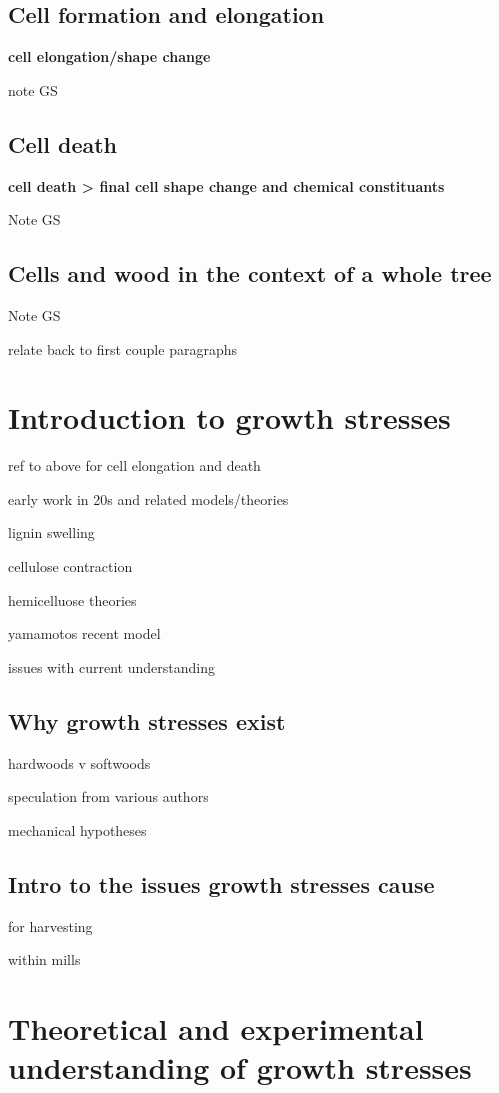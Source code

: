 \documentclass{article}
\begin{document}
\subsection{Cell formation and elongation}

\textbf{cell elongation/shape change}

note GS
\subsection{Cell death}
\textbf{cell death > final cell shape change and chemical constituants}

Note GS
\subsection{Cells and wood in the context of a whole tree}

Note GS

relate back to first couple paragraphs


\section{Introduction to growth stresses}

ref to above for cell elongation and death

early work in 20s and related models/theories

lignin swelling

cellulose contraction

hemicelluose theories

yamamotos recent model

issues with current understanding


\subsection{Why growth stresses exist}

hardwoods v softwoods

speculation from various authors

mechanical hypotheses

\subsection{Intro to the issues growth stresses cause }

for harvesting

within mills

\section{Theoretical and experimental understanding of growth stresses}
\end{document}
